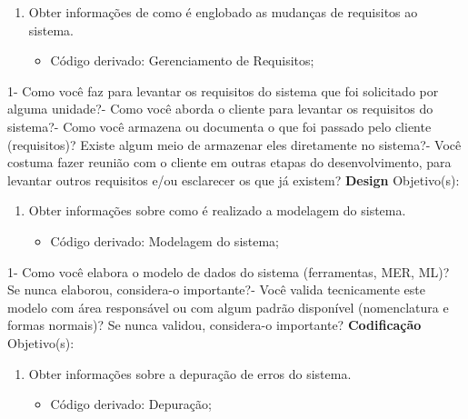 \begin{anexosenv}
\begin{enumerate}
\item Obter informações de como é englobado as mudanças de requisitos ao sistema.
\begin{itemize}
\item Código derivado: Gerenciamento de Requisitos;
\end{itemize}
\end{enumerate}
    1- Como você faz para levantar os requisitos do sistema que foi solicitado por alguma unidade?- Como você aborda o cliente para levantar os requisitos do sistema?- Como você armazena ou documenta o que foi passado pelo cliente (requisitos)? Existe algum meio de armazenar eles diretamente no sistema?- Você costuma fazer reunião com o cliente em outras etapas do desenvolvimento, para levantar outros requisitos e/ou esclarecer os que já existem?\newline\newline\newline\newline
\textbf{Design}\newline\newline
Objetivo(s):
\begin{enumerate}
\item Obter informações sobre como é realizado a modelagem do sistema.
\begin{itemize}
\item Código derivado: Modelagem do sistema;
\end{itemize}
\end{enumerate}
    1- Como você elabora o modelo de dados do sistema (ferramentas, MER, ML)? Se nunca elaborou, considera-o importante?- Você valida tecnicamente este modelo com área responsável ou com algum padrão disponível (nomenclatura e formas normais)? Se nunca validou, considera-o importante?\newline
\newline
\textbf{Codificação}\newline\newline
Objetivo(s):
\begin{enumerate}
\item Obter informações sobre a depuração de erros do sistema.
\begin{itemize}
\item Código derivado: Depuração;
\end{itemize}

\end{enumerate}
\end{anexosenv}

